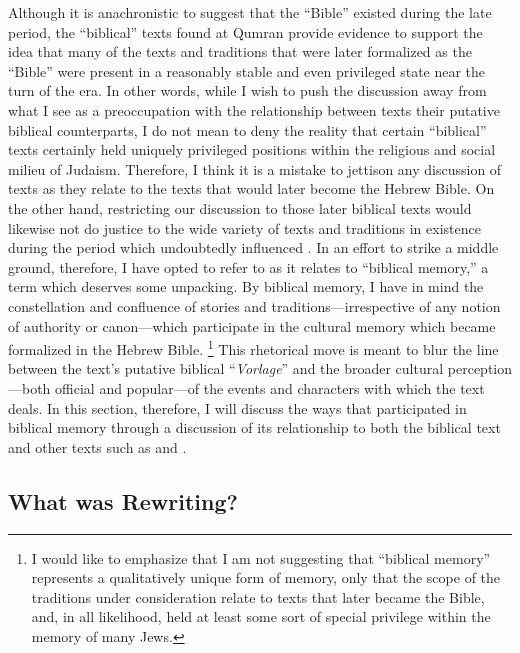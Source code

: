 Although it is anachronistic to suggest that the ``Bible''  existed during the late \secondtemple period, the ``biblical'' texts found at Qumran provide evidence to support the idea that many of the texts and traditions that were later formalized as the ``Bible'' were present in a reasonably stable and even privileged state near the turn of the era. In other words, while I wish to push the discussion away from what I see as a preoccupation with the relationship between \rwb texts their putative biblical counterparts, I do not mean to deny the reality that certain ``biblical'' texts certainly held uniquely privileged positions within the religious and social milieu of \secondtemple Judaism. Therefore, I think it is a mistake to jettison any discussion of \rwb texts as they relate to the texts that would later become the Hebrew Bible. On the other hand, restricting our discussion to those later biblical texts would likewise not do justice to the wide variety of texts and traditions in existence during the \secondtemple period which undoubtedly influenced \ga. In an effort to strike a middle ground, therefore, I have opted to refer to \ga as it relates to ``biblical memory,'' a term which deserves some unpacking. By biblical memory, I have in mind the constellation and confluence of stories and traditions---irrespective of any notion of authority or canon---which participate in the cultural memory which became formalized in the Hebrew Bible.%
    \footnote{I would like to emphasize that I am not suggesting that ``biblical memory'' represents a qualitatively unique form of memory, only that the scope of the traditions under consideration relate to texts that later became the Bible, and, in all likelihood, held at least some sort of special privilege within the memory of many \secondtemple Jews.}
This rhetorical move is meant to blur the line between the \rwb text's putative biblical ``\emph{Vorlage}'' and the broader cultural perception---both official and popular---of the events and characters with which the \rwb text deals. In this section, therefore, I will discuss the ways that \ga participated in biblical memory through a discussion of its relationship to both the biblical text and other \secondtemple texts such as \jub and \firstenoch.

\subsection{What was \ga Rewriting?}

